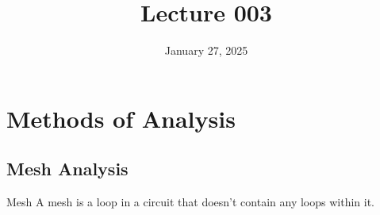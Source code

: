\documentclass[12pt]{article}
\title{Lecture 003}
\date{January 27, 2025}
\begin{document}
\newpage

\section{Methods of Analysis}
\label{sec:methodsOfAnalysis}

\subsection{Mesh Analysis}
\label{ssec:meshAnalysis}

\begin{definition}{Mesh}
  A mesh is a loop in a circuit that doesn't contain any loops within it.
\end{definition}
\end{document}
